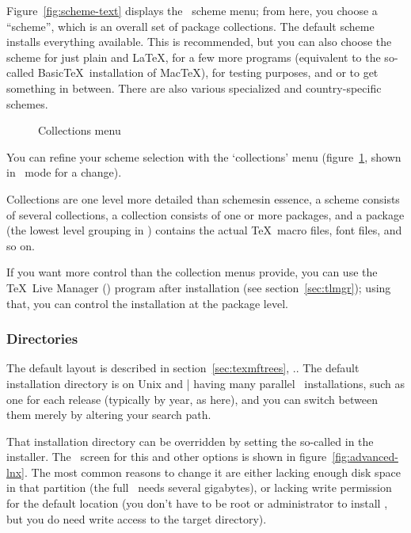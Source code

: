 \documentclass{article}
\begin{document}
Figure~\ref{fig:scheme-text} displays the \TL\ scheme menu; from here,
you choose a ``scheme'', which is an overall set of package collections.
The default  scheme installs everything available. This is
recommended, but you can also choose the  scheme for
just plain and \LaTeX,  for a few more programs
(equivalent to the so-called Basic\TeX\ installation of Mac\TeX),
 for testing purposes, and  or
 to get something in between. There are also various
specialized and country-specific schemes.

\begin{figure}[tb]
\centering {}
\caption{Collections menu}\label{fig:collections-gui}
\end{figure}

You can refine your scheme selection with the `collections' menu
(figure~\ref{fig:collections-gui}, shown in \GUI\ mode for a change).

Collections are one level more detailed than schemes\Dash in essence, a
scheme consists of several collections, a collection consists of one or
more packages, and a package (the lowest level grouping in \TL) contains
the actual \TeX\ macro files, font files, and so on.

If you want more control than the collection menus provide, you can use
the \TeX\ Live Manager () program after installation (see
section~\ref{sec:tlmgr}); using that, you can control the installation
at the package level.

\subsubsection{Directories}
\label{sec:directories}

The default layout is described in section~\ref{sec:texmftrees},
\p.\pageref{sec:texmftrees}.  The default installation directory is
 on Unix and
|%
having many parallel \TL\ installations, such as one for each release
(typically by year, as here), and you can switch between them merely by
altering your search path.

That installation directory can be overridden by setting the so-called
 in the installer.  The \GUI\ screen for this and other
options is shown in figure~\ref{fig:advanced-lnx}.  The most common reasons
to change it are either lacking enough disk space in that partition (the
full \TL\ needs several gigabytes), or lacking write permission for the
default location (you don't have to be root or administrator to install
\TL, but you do need write access to the target directory).
\end{document}
